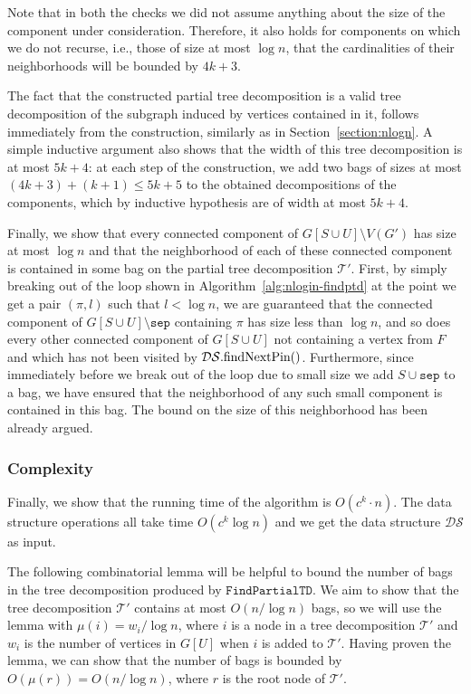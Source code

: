 \documentclass[a4paper,11pt]{article}
\theoremstyle{definition}
\theoremstyle{remark}
\newcommand{\findPTD}{\mathtt{FindPartialTD}}
\newcommand{\ds}{\mathcal{DS}}
\newcommand{\sep}{\mathtt{sep}}
\newcommand{\qpin}{\textnormal{findNextPin}}
\newcommand{\pin}{\pi}
\newcommand{\td}{\mathcal{T}} \newcommand{\tw}{\mathrm{tw}} \newcommand{\w}{\mathrm{w}}
\begin{document}
Note that in both the checks we did not assume anything about the size
of the component under consideration.  Therefore, it also holds for
components on which we do not recurse, i.e., those of size at most
$\log n$, that the cardinalities of their neighborhoods will be
bounded by $4k+3$.

The fact that the constructed partial tree decomposition is a valid
tree decomposition of the subgraph induced by vertices contained in
it, follows immediately from the construction, similarly as in
Section~\ref{section:nlogn}.  A simple inductive argument also shows
that the width of this tree decomposition is at most $5k+4$: at each
step of the construction, we add two bags of sizes at most
$(4k+3)+(k+1) \leq 5k+5$ to the obtained decompositions of the
components, which by inductive hypothesis are of width at most $5k+4$.

Finally, we show that every connected component of $G[S \cup U]\setminus V(G')$
has size at most $\log n$ and that the neighborhood of each of these
connected component is contained in some bag on the partial tree
decomposition $\td'$.  First, by simply breaking out of the loop shown
in Algorithm~\ref{alg:nlogin-findptd} at the point we get a pair
$(\pin, l)$ such that $l < \log n$, we are guaranteed that the
connected component of $G[S \cup U]\setminus \sep$ containing $\pin$
has size less than $\log n$, and so does every other connected
component of $G[S \cup U]$ not containing a vertex from $F$ and which
has not been visited by $\ds.\qpin()$.  Furthermore, since immediately
before we break out of the loop due to small size we add $S \cup \sep$
to a bag, we have ensured that the neighborhood of any such small
component is contained in this bag.  The bound on the size of this
neighborhood has been already argued.




\subsubsection{Complexity}
Finally, we show that the running time of the algorithm is $O(c^k\cdot
n)$.  The data structure operations all take time $O(c^k \log n)$ and
we get the data structure $\ds$ as input.

The following combinatorial lemma will be helpful to bound the number
of bags in the tree decomposition produced by $\findPTD$.  We aim to
show that the tree decomposition $\td'$ contains at most $O(n / \log
n)$ bags, so we will use the lemma with $\mu(i) = w_i / \log n$, where
$i$ is a node in a tree decomposition $\td'$ and $w_i$ is the number
of vertices in $G[U]$ when $i$ is added to $\td'$.  Having proven the
lemma, we can show that the number of bags is bounded by $O(\mu(r)) =
O(n / \log n)$, where $r$ is the root node of $\td'$.
\end{document}

